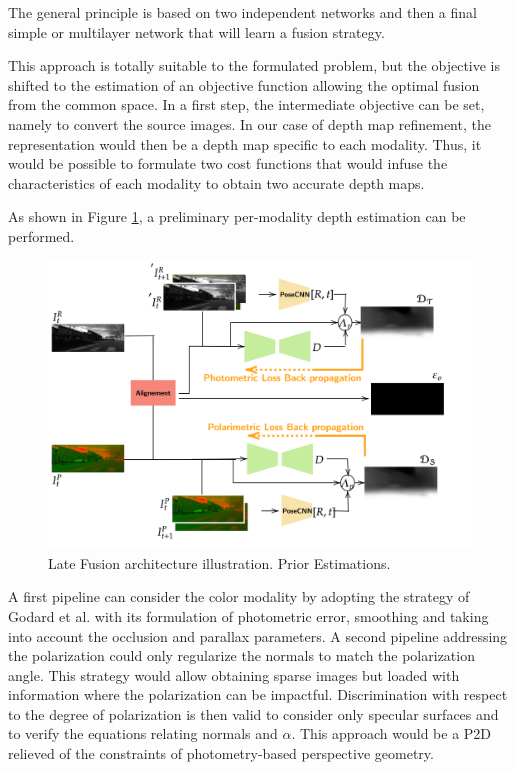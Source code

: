 The general principle is based on two independent networks and then a final simple or multilayer network that will learn a fusion strategy.

This approach is totally suitable to the formulated problem, but the objective is shifted to the estimation of an objective function allowing the optimal fusion from the common space. In a first step, the intermediate objective can be set, namely to convert the source images.
In our case of depth map refinement, the representation would then be a depth map specific to each modality. Thus, it would be possible to formulate two cost functions that would infuse the characteristics of each modality to obtain two accurate depth maps.

As shown in Figure \ref{fig:late1}, a preliminary per-modality depth estimation can be performed.

\begin{figure}[h]
	\centering
	\includegraphics[width=0.8\linewidth]{Figures/Fusion/late1}
	\caption[Late Fusion architecture illustration. Prior Estimations.]{Late Fusion architecture illustration. Prior Estimations.}
	\label{fig:late1}
\end{figure}


A first pipeline can consider the color modality by adopting the strategy of Godard et al. with its formulation of photometric error, smoothing and taking into account the occlusion and parallax parameters.
A second pipeline addressing the polarization could only regularize the normals to match the polarization angle. This strategy would allow obtaining sparse images but loaded with information where the polarization can be impactful. Discrimination with respect to the degree of polarization is then valid to consider only specular surfaces and to verify the equations relating normals and $\alpha$. This approach would be a P2D relieved of the constraints of photometry-based perspective geometry.

